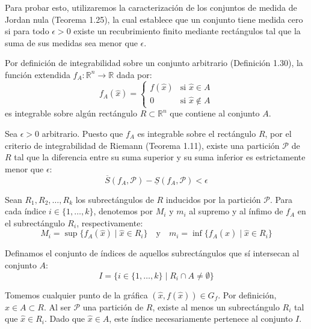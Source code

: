 \documentclass[11pt,letterpaper]{article}
\begin{document}
Para probar esto, utilizaremos la caracterización de los conjuntos de medida de Jordan nula (Teorema 1.25), la cual establece que un conjunto tiene medida cero si para todo $\epsilon > 0$ existe un recubrimiento finito mediante rectángulos tal que la suma de sus medidas sea menor que $\epsilon$.

Por definición de integrabilidad sobre un conjunto arbitrario (Definición 1.30), la función extendida $f_A: \mathbb{R}^n \rightarrow \mathbb{R}$ dada por:
\begin{equation*}
f_A(\hat{x}) = 
\begin{cases} 
f(\hat{x}) & \text{si } \hat{x} \in A \\ 
0 & \text{si } \hat{x} \notin A 
\end{cases}
\end{equation*}
es integrable sobre algún rectángulo $R \subset \mathbb{R}^n$ que contiene al conjunto $A$.

Sea $\epsilon > 0$ arbitrario. Puesto que $f_A$ es integrable sobre el rectángulo $R$, por el criterio de integrabilidad de Riemann (Teorema 1.11), existe una partición $\mathcal{P}$ de $R$ tal que la diferencia entre su suma superior y su suma inferior es estrictamente menor que $\epsilon$:
\begin{equation*}
\overline{S}(f_A, \mathcal{P}) - \underline{S}(f_A, \mathcal{P}) < \epsilon
\end{equation*}

Sean $R_1, R_2, \dots, R_k$ los subrectángulos de $R$ inducidos por la partición $\mathcal{P}$. 
Para cada índice $i \in \{1, \dots, k\}$, denotemos por $M_i$ y $m_i$ al supremo y al ínfimo de $f_A$ en el subrectángulo $R_i$, respectivamente:
\begin{equation*}
M_i = \sup \{f_A(\hat{x}) \mid \hat{x} \in R_i\} \quad \text{y} \quad m_i = \inf \{f_A(\hat{x}) \mid \hat{x} \in R_i\}
\end{equation*}

Definamos el conjunto de índices de aquellos subrectángulos que sí intersecan al conjunto $A$:
\begin{equation*}
I = \{ i \in \{1, \dots, k\} \mid R_i \cap A \neq \emptyset \}
\end{equation*}

Tomemos cualquier punto de la gráfica $(\hat{x}, f(\hat{x})) \in G_f$. Por definición, $\hat{x} \in A \subset R$. Al ser $\mathcal{P}$ una partición de $R$, existe al menos un subrectángulo $R_i$ tal que $\hat{x} \in R_i$. Dado que $\hat{x} \in A$, este índice necesariamente pertenece al conjunto $I$.
\end{document}
